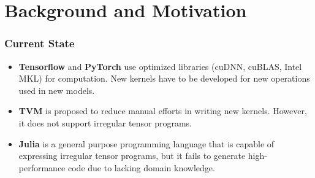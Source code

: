 \documentclass[12pt,aspectratio=169]{beamer}
\begin{document}
    \section{Background and Motivation}

    \begin{frame}
        \frametitle{Current State}

        \begin{itemize}
            \setlength{\itemsep}{.8em}
            \item \textbf{Tensorflow} and \textbf{PyTorch} use optimized libraries (cuDNN, cuBLAS, Intel MKL) for computation. New kernels have to be developed for new operations used in new models.
            \item \textbf{TVM} is proposed to reduce manual efforts in writing new kernels. However, it does not support irregular tensor programs.
            \item \textbf{Julia} is a general purpose programming language that is capable of expressing irregular tensor programs, but it fails to generate high-performance code due to lacking domain knowledge.
        \end{itemize}
    \end{frame}
\end{document}
